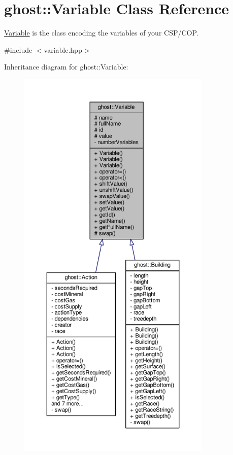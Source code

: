 \hypertarget{classghost_1_1Variable}{\section{ghost\-:\-:Variable Class Reference}
\label{classghost_1_1Variable}
}


\hyperlink{classghost_1_1Variable}{Variable} is the class encoding the variables of your C\-S\-P/\-C\-O\-P.  




{\ttfamily \#include $<$variable.\-hpp$>$}



Inheritance diagram for ghost\-:\-:Variable\-:
\nopagebreak
\begin{figure}[H]
\begin{center}
\leavevmode
\includegraphics[height=550pt]{classghost_1_1Variable__inherit__graph}
\end{center}
\end{figure}


